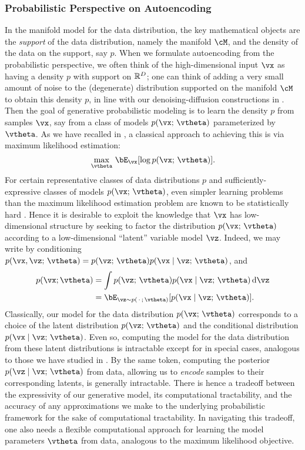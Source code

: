 \documentclass[../../book-main.tex]{subfiles}
\begin{document}
\subsubsection{Probabilistic Perspective on Autoencoding}
In the manifold model for the data distribution, the key mathematical objects
are the \textit{support} of the data distribution, namely the manifold $\cM$,
and the density of the data on the support, say $p$. When we formulate
autoencoding from the probabilistic perspective, we often think of the
high-dimensional input $\vx$ as having a density $p$ with support on $\mathbb{R}^D$; one
can think of adding a very small amount of noise to the (degenerate)
distribution supported on the manifold $\cM$ to obtain this density $p$, in line
with our denoising-diffusion constructions in .
Then the goal of generative probabilistic modeling is to learn the density $p$
from samples $\vx$, say from a class of models $p(\vx;\, \vtheta)$ parameterized
by $\vtheta$. As we have recalled in , a classical
approach to achieving this is via maximum likelihood estimation:
\begin{equation*}\label{eq:VAE-MLE}
\max_{\vtheta}\, \bE_{\vx}[ \log p(\vx;\, \vtheta) ].
\end{equation*}
For certain representative classes of data distributions $p$ %
and sufficiently-expressive classes of models $p(\vx;\, \vtheta)$, even simpler
learning problems than the maximum likelihood estimation problem are known to be
statistically hard \cite{Yang1999-wb}. Hence it is desirable to exploit the
knowledge that $\vx$ has low-dimensional structure by seeking to factor the
distribution $p(\vx ;\, \vtheta)$ according to a low-dimensional ``latent''
variable model $\vz$. Indeed, we may write by conditioning $p(\vx,
\vz ;\, \vtheta)
= p(\vz;\, \vtheta) p(\vx \mid \vz;\, \vtheta)$, and
\begin{align*}
p(\vx; \vtheta) &= \int p(\vz;\, \vtheta) p(\vx \mid \vz;\, \vtheta) \odif \vz
\\
&=
\bE_{\vz \sim p(\,\cdot\,;\, \vtheta)}[ p(\vx \mid \vz;\, \vtheta) ].
\end{align*}
Classically, our model for the data distribution $p(\vx;\, \vtheta)$ corresponds
to a choice of the latent distribution $p(\vz;\, \vtheta)$ and the conditional
distribution $p(\vx \mid \vz;\, \vtheta)$.
Even so, computing the model for the data distribution from these latent
distributions is intractable except for in special cases, analogous to those we
have studied in .
By the same token, computing the posterior $p(\vz \mid \vx;\, \vtheta)$ from
data, allowing us to \textit{encode} samples to their corresponding latents, is
generally intractable.
There is hence a tradeoff between the expressivity of our generative model,
its computational tractability, and the accuracy of any approximations we make
to the underlying probabilistic framework for the sake of
computational tractability.
In navigating this tradeoff, one also needs a flexible computational approach
for learning the model parameters $\vtheta$ from data, analogous to the maximum
likelihood objective.
\end{document}
